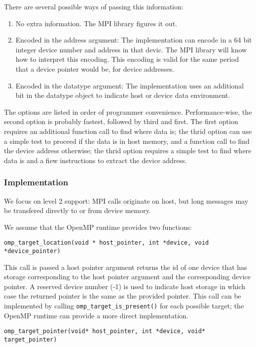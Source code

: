 \documentclass[twoside,11pt]{article}
\begin{document}
There are several possible ways of passing this information:

\begin{enumerate}
	\item 
	No extra information. The MPI library figures it out.
	\item 
	Encoded in the address argument: The implementation can encode in a 64 bit 
	integer device number and address in that devic. The MPI library will know 
	how to interpret this encoding. This encoding is 
	valid for the same period that  a device pointer would be, for device 
	addresses. 
	\item 
	Encoded in the datatype argument: The implementation uses an additional bit 
	in the datatype object to indicate host or device data environment. 
\end{enumerate}

The options are listed in order of programmer convenience. Performance-wise, 
the second option is probably fastest, followed by third and first. The first 
option requires an additional function call to find where data is; the thrid 
option can use a simple test to proceed if the data is in host memory, and a 
function call to find the device address otherwise; the thrid option requires a 
simple test to find where data is and a fiew instructions to extract the device 
address.
	
\subsubsection{Implementation}
We focus on level 2 support: MPI calls originate on host, but long messages may 
be transfered directly to or from device memory.

We assume that the OpenMP runtime provides two functions:

\texttt{omp\_target\_location(void * host\_pointer, int *device, void 
*device\_pointer)} 

This call is passed a host pointer argument
returns the id of one device that has storage corresponding to the host pointer 
argument and the corresponding device pointer. A reserved device number (-1) is 
used to indicate host storage in which case the returned pointer is the same as 
the provided pointer. This 
call 
can be implemented by calling \texttt{omp\_target\_is\_present()} for each 
possible target; the OpenMP runtime can provide a more direct implementation.

\texttt{omp\_target\_pointer(void* host\_pointer, int *device, void* 
target\_pointer)}
\end{document}
